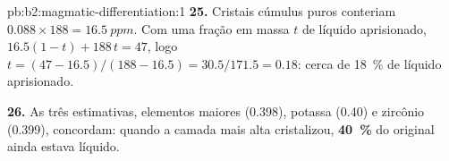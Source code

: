 \begin{solution}{pb:b2:magmatic-differentiation:1}
\textbf{25.} Cristais cúmulus puros conteriam $0.088\times188 = \qty{16.5}{ppm}$. Com uma
fração em massa $t$ de líquido aprisionado, $16.5(1 - t) + 188\,t = 47$, logo $t = (47 -
16.5)/(188 - 16.5) = 30.5/171.5 = 0.18$: cerca de \qty{18}{\percent} de líquido aprisionado.

\textbf{26.} As três estimativas, elementos maiores (0.398), potassa (0.40) e
zircônio (0.399), concordam: quando a camada mais alta cristalizou,
\textbf{\qty[text-series-to-math=true]{40}{\percent}} do  original ainda estava
líquido.
\end{solution}
